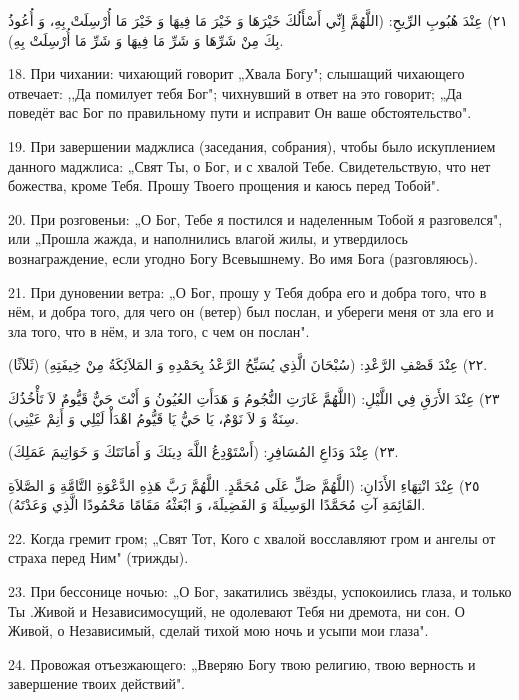 \documentclass[a5paper]{article}
\begin{document}
٢١) عِنْدَ هُبُوبِ الرِّيحِ: (اللَّهُمَّ إِنِّي أَسْأَلُكَ خَيْرَهَا وَ خَيْرَ مَا فِيهَا وَ خَيْرَ مَا أُرْسِلَتْ بِهِ، وَ أُعُوذُ بِكَ مِنْ شَرِّهَا وَ شَرِّ مَا فِيهَا وَ شَرِّ مَا أُرْسِلَتْ بِهِ).

18. При чихании: чихающий говорит „Хвала Богу"; слышащий чихающего отвечает: ,,Да помилует тебя Бог"; чихнувший в ответ на это говорит; „Да поведёт вас Бог по правильному пути и исправит Он ваше обстоятельство".

19. При завершении маджлиса (заседания, собрания), чтобы было искуплением данного маджлиса: „Свят Ты, о Бог, и с хвалой Тебе. Свидетельствую, что нет божества, кроме Тебя. Прошу Твоего прощения и каюсь перед Тобой".

20. При розговеньи: „О Бог, Тебе я постился и наделенным Тобой я разговелся", или „Прошла жажда, и наполнились влагой жилы, и утвердилось вознаграждение, если угодно Богу Всевышнему. Во имя Бога (разговляюсь).

21. При дуновении ветра: „О Бог, прошу у Тебя добра его и добра того, что в нём, и добра того, для чего он (ветер) был послан, и убереги меня от зла его и зла того, что в нём, и зла того, с чем он послан".

٢٢) عِنْدَ قَصْفِ الرَّعْدِ: (سُبْحَانَ الَّذِي يُسَبِّحُ الرَّعْدُ بِحَمْدِهِ وَ المَلاَئِكَةُ مِنْ خِيفَتِهِ) (ثَلاَثًا).

٢٣) عِنْدَ الأَرَقِ فِي اللَّيْلِ: (اللَّهُمَّ غَارَتِ النُّجُومُ وَ هَدَأَتِ العُيُونُ وَ أَنْتَ حَيٌّ قَيُّومٌ لاَ تَأْخُذُكَ سِنَةٌ وَ لاَ نَوْمٌ، يَا حَيُّ يَا قَيُّومُ اهْدَأْ لَيْلِي وَ أَنِمْ عَيْنِي).

٢٣) عِنْدَ وَدَاعِ المُسَافِرِ: (أَسْتَوْدِعُ اللَّهَ دِينَكَ وَ أَمَانَتَكَ وَ خَوَاتِيمَ عَمَلِكَ).

٢٥) عِنْدَ انْتِهَاءِ الأَذَانِ: (اللَّهُمَّ صَلِّ عَلَى مُحَمَّدٍ. اللَّهُمَّ رَبَّ هَذِهِ الدَّعْوَةِ التَّامَّةِ وَ الصَّلاَةِ القَائِمَةِ آتِ مُحَمَّدًا الوَسِيلَةَ وَ الفَضِيلَةَ، وَ ابْعَثْهُ مَقَامًا مَحْمُودًا الَّذِي وَعَدْتَهُ).

22. Когда гремит гром; „Свят Тот, Кого с хвалой восславляют гром и ангелы от страха перед Ним" (трижды).

23. При бессонице ночью: „О Бог, закатились звёзды, успокоились глаза, и только Ты .Живой и Независимосущий, не одолевают Тебя ни дремота, ни сон. О Живой, о Независимый, сделай тихой мою ночь и усыпи мои глаза".

24. Провожая отъезжающего: „Вверяю Богу твою религию, твою верность и завершение твоих действий".
\end{document}
